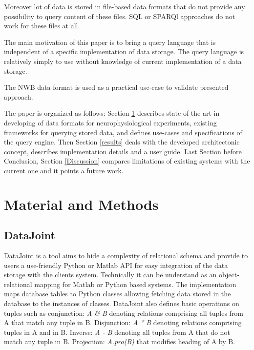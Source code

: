 \documentclass[utf8]{frontiersSCNS} %
\begin{document}
Moreover lot of data is stored in file-based data formats that do not provide any possibility to query content of these files. SQL or SPARQl approaches do not work for these files at all. 

The main motivation of this paper is to bring a query language that is independent of a specific implementation of data storage. The query language is relatively simply to use without knowledge of current implementation of a data storage. 

The NWB data format is used as a practical use-case to validate presented approach.

The paper is organized as follows: Section \ref{materials_and_methods} describes state of the art in developing of data formats for neurophysiological experiments, existing frameworks for querying stored data, and defines use-cases and specifications of the query engine. Then Section  \ref{results}  deals with the developed architectonic concept, describes implementation details and a user guide. Last Section before Conclusion, Section  \ref{Discussion} compares limitations of existing systems with the current one and it points a future work. 

\section{Material and Methods}
\label{materials_and_methods}


\subsection{DataJoint}
\label{DataJoint}

DataJoint \citep{Yatsenko031658} is a tool aims to hide a complexity of relational schema and provide to users a use-friendly Python or Matlab API for easy integration of the data storage with the clients system. Technically it can be understand as an object-relational mapping \citep{Keith2010} for Matlab or Python based systems. The implementation maps database tables to Python classes allowing fetching data stored in the database to the instances of classes. DataJoint also defines basic operations on tuples such as conjunction: \emph{A \& B} denoting relations comprising all tuples from A that match any tuple in B. Disjunction: \emph{A * B} denoting relations comprising tuples in A and in B. Inverse: \emph{A - B} denoting all tuples from A that do not match any tuple in B. Projection: \emph{A.pro(B)} that modifies heading of A by B.
\end{document}
